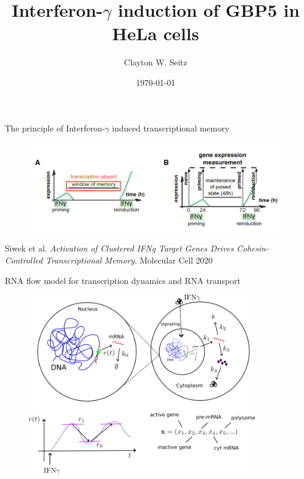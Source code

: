 \documentclass[aspectratio=1610]{beamer}					%
\title{Interferon-$\gamma$ induction of GBP5 in HeLa cells}	%
\author{Clayton W. Seitz}								%
\date{\today}									%
\begin{document}
\begin{frame}
  \titlepage
\end{frame}


%

\begin{frame}{The principle of Interferon-$\gamma$ induced transcriptional memory}
\begin{figure}
\includegraphics[width=14cm]{Memory.png}
\caption{}
\end{figure}

Siwek et al. \textit{Activation of Clustered IFNg Target Genes Drives Cohesin-Controlled Transcriptional Memory}. Molecular Cell 2020

\end{frame}

\begin{frame}{RNA flow model for transcription dynamics and RNA transport}
\begin{figure}
\includegraphics[width=10cm]{RNAFlow.png}
\end{figure}
\end{frame}
\end{document}
